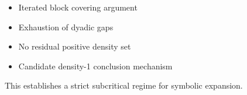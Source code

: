 \documentclass[12pt, oneside]{article}
\numberwithin{equation}{section}
\theoremstyle{definition}
\theoremstyle{plain}
\theoremstyle{remark}
\begin{document}
\begin{itemize}
    \item Iterated block covering argument
    \item Exhaustion of dyadic gaps
    \item No residual positive density set
    \item Candidate density-1 conclusion mechanism
\end{itemize}


This establishes a strict subcritical regime for symbolic expansion.

\clearpage


\end{document}

